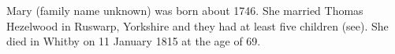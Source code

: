 
Mary (family name unknown) was born about 1746.  She married Thomas Hezelwood in Ruswarp, Yorkshire and they had at least five children (see).  She died in Whitby on 11 January 1815 at the age of 69.\cite{MaryHezelwoodDeath}
